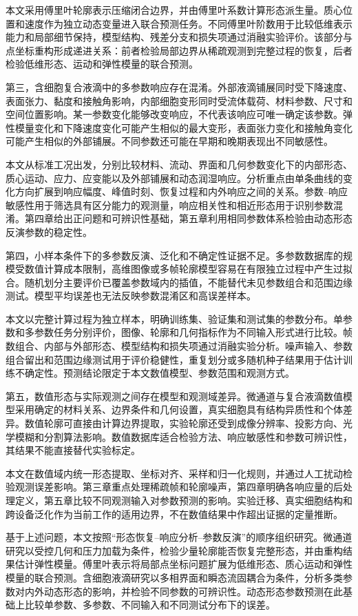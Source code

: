 本文采用傅里叶轮廓表示压缩闭合边界，并由傅里叶系数计算形态派生量。质心位置和速度作为独立动态变量进入联合预测任务。不同傅里叶阶数用于比较低维表示能力和局部细节保持，模型结构、残差分支和损失项通过消融实验评价。该部分与点坐标重构形成递进关系：前者检验局部边界从稀疏观测到完整过程的恢复，后者检验低维形态、运动和弹性模量的联合预测。

第三，含细胞复合液滴中的多参数响应存在混淆。外部液滴铺展同时受下降速度、表面张力、黏度和接触角影响，内部细胞变形同时受流体载荷、材料参数、尺寸和空间位置影响。某一参数变化能够改变响应，不代表该响应可唯一确定该参数。弹性模量变化和下降速度变化可能产生相似的最大变形，表面张力变化和接触角变化可能产生相似的外部铺展。不同参数还可能在早期和晚期表现出不同敏感性。

本文从标准工况出发，分别比较材料、流动、界面和几何参数变化下的内部形态、质心运动、应力、应变能以及外部铺展和动态润湿响应。分析重点由单条曲线的变化方向扩展到响应幅度、峰值时刻、恢复过程和内外响应之间的关系。参数--响应敏感性用于筛选具有区分能力的观测量，响应相关性和相近形态用于识别参数混淆。第四章给出正问题和可辨识性基础，第五章利用相同参数体系检验由动态形态反演参数的稳定性。

第四，小样本条件下的多参数反演、泛化和不确定性证据不足。多参数数据库的规模受数值计算成本限制，高维图像或多帧轮廓模型容易在有限独立过程中产生过拟合。随机划分主要评价已覆盖参数域内的插值，不能替代未见参数组合和范围边缘测试。模型平均误差也无法反映参数混淆区和高误差样本。

本文以完整计算过程为独立样本，明确训练集、验证集和测试集的参数分布。单参数和多参数任务分别评价，图像、轮廓和几何指标作为不同输入形式进行比较。帧数组合、内部与外部形态、模型结构和损失项通过消融实验分析。噪声输入、参数组合留出和范围边缘测试用于评价稳健性，重复划分或多随机种子结果用于估计训练不确定性。预测结论限定于本文数值模型、参数范围和观测方式。

第五，数值形态与实际观测之间存在模型和观测域差异。微通道与复合液滴数值模型采用确定的材料关系、边界条件和几何设置，真实细胞具有结构异质性和个体差异。数值轮廓可直接由计算边界提取，实验轮廓还受到成像分辨率、投影方向、光学模糊和分割算法影响。数值数据库适合检验方法、响应敏感性和参数可辨识性，其结果不能直接替代实验标定。

本文在数值域内统一形态提取、坐标对齐、采样和归一化规则，并通过人工扰动检验观测误差影响。第三章重点处理稀疏帧和轮廓噪声，第四章明确各响应量的后处理定义，第五章比较不同观测输入对参数预测的影响。实验迁移、真实细胞结构和跨设备泛化作为当前工作的适用边界，不在数值结果中作超出证据的定量推断。

基于上述问题，本文按照“形态恢复--响应分析--参数反演”的顺序组织研究。微通道研究以受控几何和压力加载为条件，检验少量轮廓能否恢复完整形态，并由重构结果估计弹性模量。傅里叶表示将局部点坐标问题扩展为低维形态、质心运动和弹性模量的联合预测。含细胞液滴研究以多相界面和瞬态流固耦合为条件，分析多类参数对内外动态形态的影响，并检验不同参数的可辨识性。动态形态参数预测在此基础上比较单参数、多参数、不同输入和不同测试分布下的误差。

